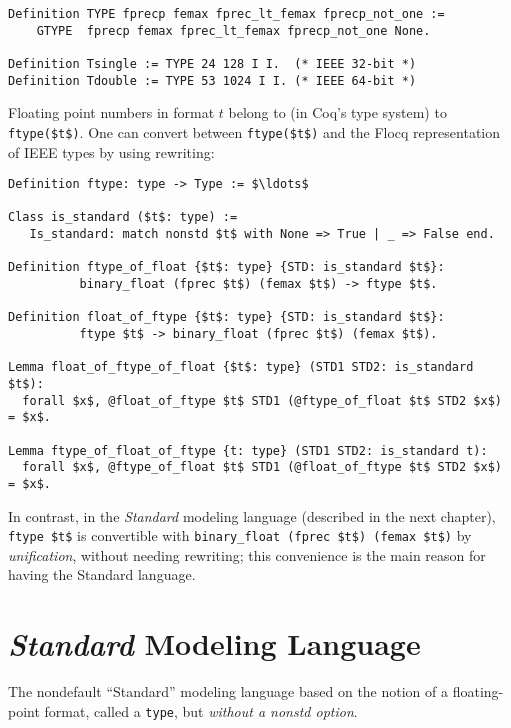 \documentclass[article]{memoir}
\begin{document}
\begin{lstlisting}
Definition TYPE fprecp femax fprec_lt_femax fprecp_not_one :=
    GTYPE  fprecp femax fprec_lt_femax fprecp_not_one None.

Definition Tsingle := TYPE 24 128 I I.  (* IEEE 32-bit *)
Definition Tdouble := TYPE 53 1024 I I. (* IEEE 64-bit *)
\end{lstlisting}
  
Floating point numbers in format $t$ belong to (in Coq's type system) to \lstinline{ftype($t$)}.  One
can convert between \lstinline{ftype($t$)} and the Flocq representation of IEEE types by using
rewriting:

\begin{lstlisting}
Definition ftype: type -> Type := $\ldots$  

Class is_standard ($t$: type) := 
   Is_standard: match nonstd $t$ with None => True | _ => False end. 

Definition ftype_of_float {$t$: type} {STD: is_standard $t$}:
          binary_float (fprec $t$) (femax $t$) -> ftype $t$.

Definition float_of_ftype {$t$: type} {STD: is_standard $t$}:
          ftype $t$ -> binary_float (fprec $t$) (femax $t$).

Lemma float_of_ftype_of_float {$t$: type} (STD1 STD2: is_standard $t$):
  forall $x$, @float_of_ftype $t$ STD1 (@ftype_of_float $t$ STD2 $x$) = $x$.

Lemma ftype_of_float_of_ftype {t: type} (STD1 STD2: is_standard t):
  forall $x$, @ftype_of_float $t$ STD1 (@float_of_ftype $t$ STD2 $x$) = $x$.
\end{lstlisting}

In contrast, in the \emph{Standard} modeling language (described in the next chapter), 
\lstinline{ftype $t$} is convertible with \lstinline{binary_float (fprec $t$) (femax $t$)}
by \emph{unification}, without needing rewriting; this convenience is the main
reason for having the Standard language.

\chapter{\emph{Standard} Modeling Language}

The nondefault ``Standard'' modeling language based on the notion of a floating-point format, called a \lstinline{type},
but \emph{without a nonstd option}.
\end{document}
